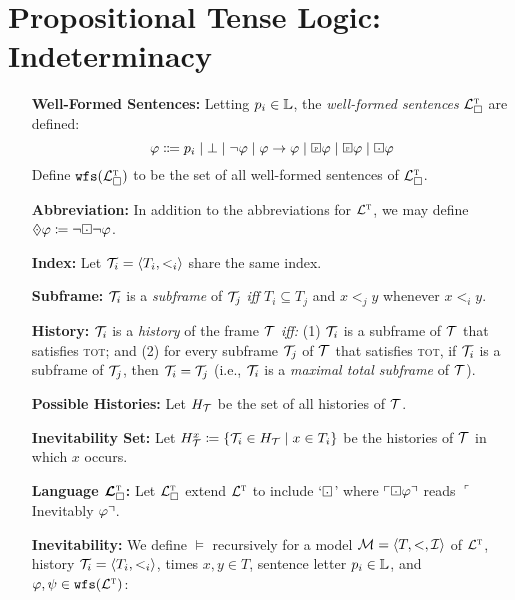 \documentclass[a4paper, 11pt]{article} %
\begin{document}
\section*{\sc Propositional Tense Logic: Indeterminacy}
  
\begin{enumerate}[leftmargin=1.2in]
	\item[\bf Well-Formed Sentences:] Letting $p_i \in \mathbb{L}$, the \textit{well-formed sentences} $\mathcal{L}^{\textsc{t}}_\square$ are defined:
    \[ \metaA \Coloneq p_i \mid 
      \bot \mid 
      \neg\metaA \mid 
      \metaA \rightarrow \metaA \mid 
      \Past\metaA \mid 
      \Future\metaA \mid
      \Inevitably\metaA
    \]
    Define $\texttt{wfs}(\mathcal{L}^{\textsc{t}}_\square)$ to be the set of all well-formed sentences of $\mathcal{L}^{\textsc{t}}_\square$.
  \item[\bf Abbreviation:] In addition to the abbreviations for $\mathcal{L}^{\textsc{t}}$, we may define $\inevitably\metaA \coloneq \neg\Inevitably\neg \metaA$.
  \item[\bf Index:] Let $\mathcal{T}_i = \langle T_i, <_i\rangle$ share the same index. 
  \item[\bf Subframe:] $\mathcal{T}_i$ is a \textit{subframe} of $\mathcal{T}_j$ \textit{iff} $T_i \subseteq T_j$ and $x <_j y$ whenever $x <_i y$. 
  \item[\bf History:] $\mathcal{T}_i$ is a \textit{history} of the frame $\mathcal{T}$ \textit{iff:} (1) $\mathcal{T}_i$ is a subframe of $\mathcal{T}$ that satisfies \textsc{tot}; and (2) for every subframe $\mathcal{T}_j$ of $\mathcal{T}$ that satisfies \textsc{tot}, if $\mathcal{T}_i$ is a subframe of $\mathcal{T}_j$, then $\mathcal{T}_i = \mathcal{T}_j$ (i.e., $\mathcal{T}_i$ is a \textit{maximal total subframe} of $\mathcal{T}$).
  \item[\bf Possible Histories:] Let $H_{\mathcal{T}}$ be the set of all histories of $\mathcal{T}$.
  \item[\bf Inevitability Set:] Let $H_{\mathcal{T}}^x \coloneq \lbrace\mathcal{T}_i \in H_{\mathcal{T}} \mid x \in T_i\rbrace$ be the histories of $\mathcal{T}$ in which $x$ occurs.
  \item[\bf Language $\boldsymbol{\mathcal{L}^{\textsc{t}}_\square}$:] Let $\mathcal{L}^{\textsc{t}}_\square$ extend $\mathcal{L}^{\textsc{t}}$ to include `$\Inevitably$' where $\corner{\Inevitably\metaA}$ reads $\ulcorner$Inevitably $\varphi\urcorner$.
  \item[\bf Inevitability:] We define $\vDash$ recursively for a model $\mathcal{M} = \langle T, <, \mathcal{I}\rangle$ of $\mathcal{L}^{\textsc{t}}$, history $\mathcal{T}_i = \langle T_i, <_i\rangle$, times $x, y \in T$, sentence letter $p_i \in \mathbb{L}$, and $\varphi, \psi \in \texttt{wfs}(\mathcal{L}^{\textsc{t}})$:
    \begin{itemize}[leftmargin=.15in]\small

\end{itemize}
\end{enumerate}
\end{document}
